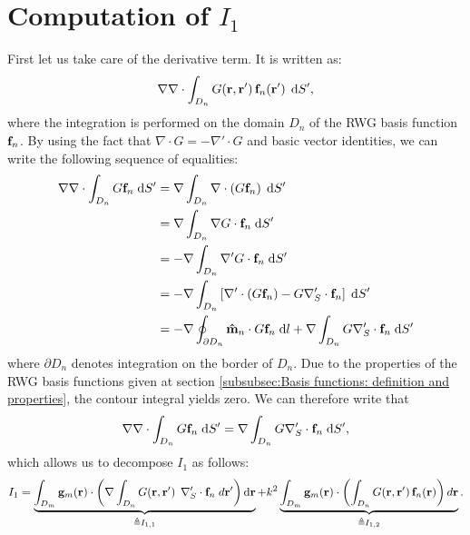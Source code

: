 \section{Computation of $I_1$}
%
\par
First let us take care of the derivative term. It is written as:
\begin{equation}
\nabla \nabla \cdot \int_{D_n} G\!\left(\mathbf{r},\mathbf{r}'\right) \mathbf{f}_n\!\left(\mathbf{r}'\right) \; \text{d} S',
\end{equation}
where the integration is performed on the domain $D_n$ of the RWG basis function $\mathbf{f}_n$. By using the fact that $\nabla \cdot G = -\nabla' \cdot G$ and basic vector identities, we can write the following sequence of equalities:
\begin{equation*}
\begin{split}
\nabla \nabla \cdot \int_{D_n} G \mathbf{f}_n \; \text{d} S' &= \nabla \int_{D_n} \nabla \cdot \left(G \mathbf{f}_n \right) \; \text{d} S' \\
&= \nabla \int_{D_n} \nabla G \cdot \mathbf{f}_n \; \text{d} S' \\
&= -\nabla \int_{D_n} \nabla' G \cdot \mathbf{f}_n \; \text{d} S' \\
&= -\nabla \int_{D_n} \left[\nabla' \cdot \left(G \mathbf{f}_n \right) - G \nabla_S^\prime \cdot \mathbf{f}_n\right]\; \text{d} S'\\
&= -\nabla \oint_{\partial D_n} \mathbf{\Hat{m}}_n \cdot G \mathbf{f}_n \; \text{d} l + \nabla \int_{D_n} G \nabla_S^\prime \cdot \mathbf{f}_n  \; \text{d} S'
\end{split}
\end{equation*}
where $\partial D_n$ denotes integration on the border of $D_n$. Due to the properties of the RWG basis functions given at section \ref{subsubsec:Basis functions: definition and properties}, the contour integral yields zero. We can therefore write that 
\begin{equation}
\nabla \nabla \cdot \int_{D_n} G \mathbf{f}_n \; \text{d} S' = \nabla \int_{D_n} G \nabla_S^\prime \cdot \mathbf{f}_n  \; \text{d} S',
\end{equation}
which allows us to decompose $I_1$ as follows:
\begin{equation}
I_1 = \underbrace{\int_{D_m} \mathbf{g}_m\!\left(\mathbf{r}\right) \cdot \left(\nabla \int_{D_n} G\!\left(\mathbf{r},\mathbf{r}'\right) \; \nabla_S^\prime \cdot \mathbf{f}_n  \; d \mathbf{r}'\right) \text{d} \mathbf{r} }_{\triangleq I_{1,1}} + k^2\underbrace{\int_{D_m}\mathbf{g}_m \!\left(\mathbf{r}\right) \cdot \left( \int_{D_n} G\!\left(\mathbf{r},\mathbf{r}'\right) \mathbf{f}_n\!\left(\mathbf{r}\right)\right) d\mathbf{r}}_{\triangleq I_{1,2}}.
\end{equation}


